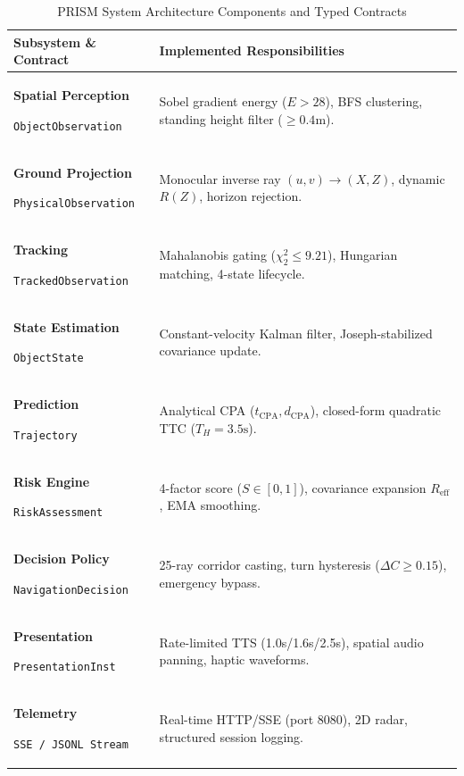\begin{table}[t]
\caption{PRISM System Architecture Components and Typed Contracts}
\label{tab:components}
\centering
\footnotesize
\setlength{\tabcolsep}{4pt}
\begin{tabularx}{\columnwidth}{p{2.6cm}X}
\toprule
\textbf{Subsystem \& Contract} & \textbf{Implemented Responsibilities} \\
\midrule
\textbf{Spatial Perception}\par\scriptsize\texttt{ObjectObservation} & Sobel gradient energy ($E>28$), BFS clustering, standing height filter ($\ge 0.4\text{m}$). \\
\addlinespace[2pt]
\textbf{Ground Projection}\par\scriptsize\texttt{PhysicalObservation} & Monocular inverse ray $(u,v) \to (X,Z)$, dynamic $R(Z)$, horizon rejection. \\
\addlinespace[2pt]
\textbf{Tracking}\par\scriptsize\texttt{TrackedObservation} & Mahalanobis gating ($\chi_2^2 \le 9.21$), Hungarian matching, 4-state lifecycle. \\
\addlinespace[2pt]
\textbf{State Estimation}\par\scriptsize\texttt{ObjectState} & Constant-velocity Kalman filter, Joseph-stabilized covariance update. \\
\addlinespace[2pt]
\textbf{Prediction}\par\scriptsize\texttt{Trajectory} & Analytical CPA ($t_{\text{CPA}}, d_{\text{CPA}}$), closed-form quadratic TTC ($T_H = 3.5\text{s}$). \\
\addlinespace[2pt]
\textbf{Risk Engine}\par\scriptsize\texttt{RiskAssessment} & 4-factor score ($S \in [0,1]$), covariance expansion $R_{\text{eff}}$, EMA smoothing. \\
\addlinespace[2pt]
\textbf{Decision Policy}\par\scriptsize\texttt{NavigationDecision} & 25-ray corridor casting, turn hysteresis ($\Delta C \ge 0.15$), emergency bypass. \\
\addlinespace[2pt]
\textbf{Presentation}\par\scriptsize\texttt{PresentationInst} & Rate-limited TTS (1.0s/1.6s/2.5s), spatial audio panning, haptic waveforms. \\
\addlinespace[2pt]
\textbf{Telemetry}\par\scriptsize\texttt{SSE / JSONL Stream} & Real-time HTTP/SSE (port 8080), 2D radar, structured session logging. \\
\bottomrule
\end{tabularx}
\end{table}
